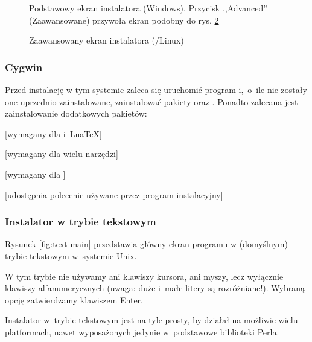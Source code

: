 \documentclass{article}
\begin{document}
\begin{figure}[tb]
\caption{Podstawowy ekran instalatora (Windows). Przycisk ,,Advanced'' (Zaawansowane) przywoła ekran podobny do  rys. \ref{fig:advanced-lnx}}\label{fig:basic-w32}
\end{figure}

\begin{figure}[tb]
\caption{Zaawansowany ekran instalatora \GUI{}
  (\GNU/Linux)}\label{fig:advanced-lnx}
\end{figure}


\subsubsection{Cygwin}
\label{sec:cygwin}

Przed instalację w tym systemie zaleca się  uruchomić program
 i,~o~ile nie zostały one uprzednio zainstalowane,
zainstalować pakiety  oraz .
Ponadto zalecana jest zainstalowanie dodatkowych pakietów:
\begin{itemize*}
\item {} [wymagany dla \XeTeX{} i~Lua\TeX]
\item {} [wymagany dla wielu narzędzi]
\item {} [wymagany dla ]
\item {} [udostępnia polecenie 
używane przez program instalacyjny]
\end{itemize*}

\subsubsection{Instalator w trybie tekstowym}

Rysunek \ref{fig:text-main} przedstawia główny ekran programu
 w (domyślnym) trybie tekstowym w~systemie Unix.

W tym trybie nie używamy ani klawiszy kursora, ani myszy,
lecz wyłącznie klawiszy alfanumerycznych (uwaga: duże i~małe litery są
rozróżniane!). Wybraną opcję zatwierdzamy klawiszem Enter.

Instalator w~trybie tekstowym jest na tyle prosty, by działał na
możliwie wielu platformach, nawet wyposażonych jedynie w~podstawowe
biblioteki Perla.
\end{document}
